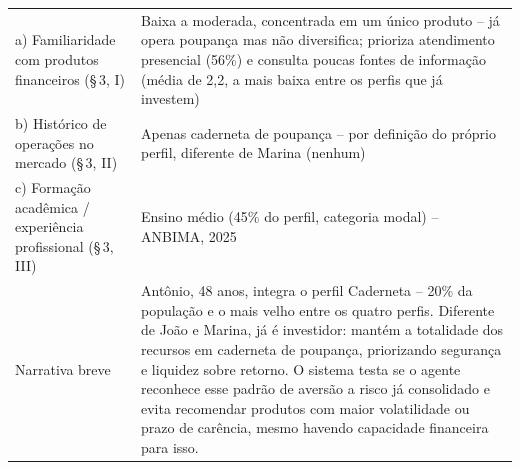 \begin{quadro}[htbp]
\begin{tabular}{p{5cm}p{8cm}}
    \quad a) Familiaridade com produtos financeiros (\S\,3\textordmasculine{}, I) & Baixa a moderada, concentrada em um \'unico produto -- j\'a opera poupan\c{c}a mas n\~ao diversifica; prioriza atendimento presencial (56\%) e consulta poucas fontes de informa\c{c}\~ao (m\'edia de 2,2, a mais baixa entre os perfis que j\'a investem) \\
    \quad b) Hist\'orico de opera\c{c}\~oes no mercado (\S\,3\textordmasculine{}, II) & Apenas caderneta de poupan\c{c}a -- por defini\c{c}\~ao do pr\'oprio perfil, diferente de Marina (nenhum) \\
    \quad c) Forma\c{c}\~ao acad\^emica / experi\^encia profissional (\S\,3\textordmasculine{}, III) & Ensino m\'edio (45\% do perfil, categoria modal) -- ANBIMA, 2025 \\
    Narrativa breve & Ant\^onio, 48 anos, integra o perfil Caderneta -- 20\% da popula\c{c}\~ao e o mais velho entre os quatro perfis. Diferente de Jo\~ao e Marina, j\'a \'e investidor: mant\'em a totalidade dos recursos em caderneta de poupan\c{c}a, priorizando seguran\c{c}a e liquidez sobre retorno. O sistema testa se o agente reconhece esse padr\~ao de avers\~ao a risco j\'a consolidado e evita recomendar produtos com maior volatilidade ou prazo de car\^encia, mesmo havendo capacidade financeira para isso. \\
    \bottomrule
  \end{tabular}
\end{quadro}

